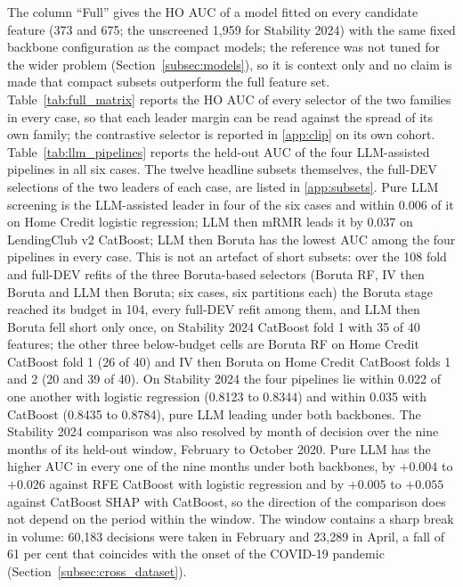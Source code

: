 \documentclass[final,5p,twocolumn]{elsarticle}
\begin{document}
The column ``Full'' gives the HO AUC of a model fitted on every candidate feature (373 and 675; the unscreened 1,959 for Stability 2024) with the same fixed backbone configuration as the compact models; the reference was not tuned for the wider problem (Section~\ref{subsec:models}), so it is context only and no claim is made that compact subsets outperform the full feature set. Table~\ref{tab:full_matrix} reports the HO AUC of every selector of the two families in every case, so that each leader margin can be read against the spread of its own family; the contrastive selector is reported in \ref{app:clip} on its own cohort. Table~\ref{tab:llm_pipelines} reports the held-out AUC of the four LLM-assisted pipelines in all six cases. The twelve headline subsets themselves, the full-DEV selections of the two leaders of each case, are listed in \ref{app:subsets}. Pure LLM screening is the LLM-assisted leader in four of the six cases and within 0.006 of it on Home Credit logistic regression; LLM then mRMR leads it by 0.037 on LendingClub v2 CatBoost; LLM then Boruta has the lowest AUC among the four pipelines in every case. This is not an artefact of short subsets: over the 108 fold and full-DEV refits of the three Boruta-based selectors (Boruta RF, IV then Boruta and LLM then Boruta; six cases, six partitions each) the Boruta stage reached its budget in 104, every full-DEV refit among them, and LLM then Boruta fell short only once, on Stability 2024 CatBoost fold 1 with 35 of 40 features; the other three below-budget cells are Boruta RF on Home Credit CatBoost fold 1 (26 of 40) and IV then Boruta on Home Credit CatBoost folds 1 and 2 (20 and 39 of 40). On Stability 2024 the four pipelines lie within 0.022 of one another with logistic regression (0.8123 to 0.8344) and within 0.035 with CatBoost (0.8435 to 0.8784), pure LLM leading under both backbones. The Stability 2024 comparison was also resolved by month of decision over the nine months of its held-out window, February to October 2020. Pure LLM has the higher AUC in every one of the nine months under both backbones, by $+0.004$ to $+0.026$ against RFE CatBoost with logistic regression and by $+0.005$ to $+0.055$ against CatBoost SHAP with CatBoost, so the direction of the comparison does not depend on the period within the window. The window contains a sharp break in volume: 60,183 decisions were taken in February and 23,289 in April, a fall of 61 per cent that coincides with the onset of the COVID-19 pandemic (Section~\ref{subsec:cross_dataset}).
\end{document}
